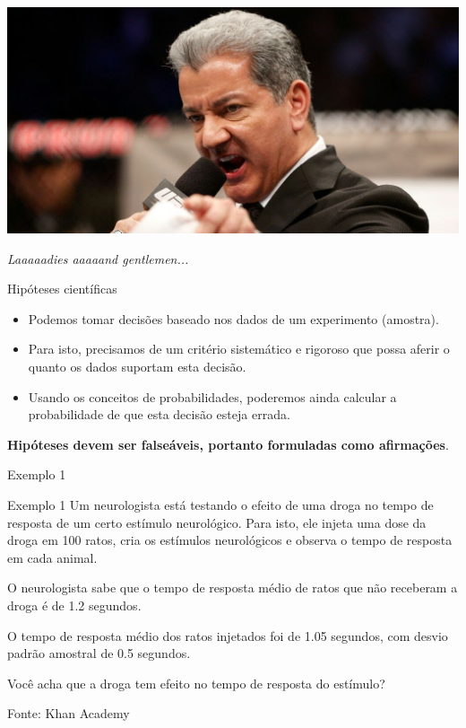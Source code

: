 \documentclass{beamer}
\begin{document}
\begin{frame}{\scriptsize }
  \begin{center}
    \includegraphics[width=.9\textwidth]{Cap10-11/its-time}

    \vfill
    {\footnotesize \em Laaaaadies aaaaand gentlemen...}
  \end{center}
\end{frame}

\begin{frame}{\scriptsize Hipóteses científicas}
  \begin{itemize}
    \footnotesize
  \item Podemos tomar decisões baseado nos dados de um experimento
    (amostra).
  \item Para isto, precisamos de um critério sistemático e rigoroso
    que possa aferir o quanto os dados suportam esta decisão.
  \item Usando os conceitos de probabilidades, poderemos ainda
    calcular a probabilidade de que esta decisão esteja errada.
  \end{itemize}
  \begin{block}{}
    \scriptsize
    {\bf Hipóteses devem ser falseáveis, portanto formuladas como afirmações}.
  \end{block}
\end{frame}

\begin{frame}{\scriptsize Exemplo 1}
  \begin{exampleblock}{Exemplo 1}
    \scriptsize
    Um neurologista está testando o efeito de uma droga no tempo de
    resposta de um certo estímulo neurológico.
    Para isto, ele injeta uma dose da droga em 100 ratos, cria
    os estímulos neurológicos e observa o tempo de resposta em cada
    animal.

    \medskip
    O neurologista sabe que o tempo de resposta médio de ratos que não
    receberam a droga é de 1.2 segundos.

    \medskip
    O tempo de resposta médio dos ratos injetados foi de
    1.05 segundos, com desvio padrão amostral de
    0.5 segundos.
  \end{exampleblock}
  \begin{block}{}
    \scriptsize
    Você acha que a droga tem efeito no tempo de resposta do estímulo?
  \end{block}
  \hfill {\scriptsize Fonte: Khan Academy}
\end{frame}
\end{document}

